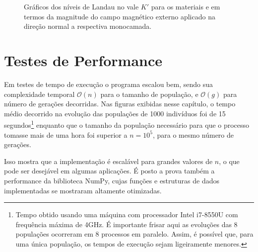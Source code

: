 \begin{figure}[p]
\begin{subfigure}{\textwidth}
    \caption{}
    \label{fig:crse2_k_prime_valley_landau_levels}
  \end{subfigure}
  \caption{
    Gráficos dos níveis de Landau no vale $K'$ para os materiais
      e
      em termos da
    magnitude do campo magnético externo aplicado na direção normal a respectiva
    monocamada.
  }
  \label{fig:k_prime_valley_landau_levels}
\end{figure}

\section{Testes de Performance}

Em testes de tempo de execução o programa escalou bem, sendo sua complexidade temporal $\mathcal{O}(n)$ para o
tamanho de população, e $\mathcal{O}(g)$ para número de gerações decorridas. 
Nas figuras exibidas nesse capítulo, o tempo médio decorrido na evolução das populações de 1000 indivíduos
foi de 15 segundos\footnote{
  Tempo obtido usando uma máquina com processador Intel i7-8550U com frequência máxima de 4GHz.
  É importante frisar aqui as evoluções das 8 populações ocorreram em 8 processos em paralelo.
  Assim, é possível que, para uma única população, os tempos de execução sejam ligeiramente menores.
} enquanto que o tamanho da população necessário para que o processo tomasse mais de uma hora foi
superior a $n = 10^5$, para o mesmo número de gerações.

Isso mostra que a implementação é escalável para grandes valores de $n$, o que pode ser desejável em
algumas aplicações. É posto a prova também a performance da biblioteca NumPy, cujas funções e estruturas
de dados implementadas se mostraram altamente otimizadas.
